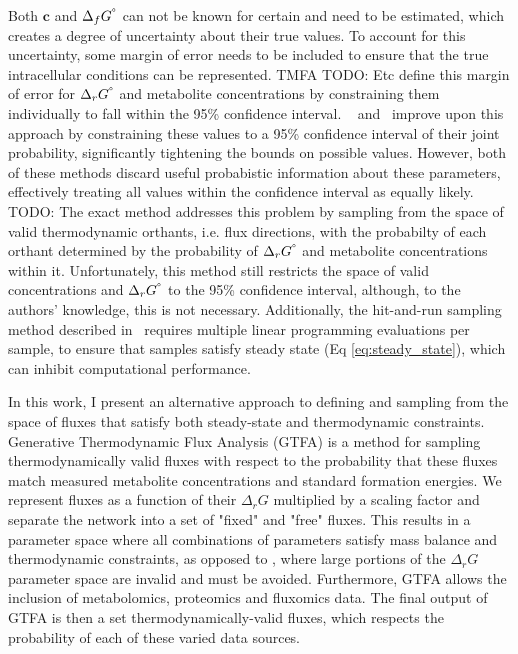 \documentclass[10pt,letterpaper]{article}
\newcommand{\sdgf}{\Delta_fG^{\degree}}
\newcommand{\dgr}{\Delta_rG}
\newcommand{\sdgr}{\Delta_rG^{\degree}}
\begin{document}

Both $\mathbf{c}$ and $\sdgf$ can not be known for certain and need to be estimated, which creates a degree of uncertainty about their true values.
To account for this uncertainty, some margin of error needs to be included to ensure that the true intracellular conditions can be represented.
TMFA {TODO: Etc} define this margin of error for $\sdgr$ and metabolite concentrations by constraining them individually to fall within the 95\% confidence interval.
~\cite{multiTFA} and~\cite{PTA} improve upon this approach by constraining these values to a 95\% confidence interval of their joint probability, significantly tightening the bounds on possible values.
However, both of these methods discard useful probabistic information about these parameters, effectively treating all values within the confidence interval as equally likely.
~\cite{PTA} {TODO: The exact method} addresses this problem by sampling from the space of valid thermodynamic orthants, i.e. flux directions, with the probabilty of each orthant determined by the probability of $\sdgr$ and metabolite concentrations within it.
Unfortunately, this method still restricts the space of valid concentrations and $\sdgr$ to the 95\% confidence interval, although, to the authors' knowledge, this is not necessary.
Additionally, the hit-and-run sampling method described in~\cite{PTA} requires multiple linear programming evaluations per sample, to ensure that samples satisfy steady state (Eq \ref{eq:steady_state}), which can inhibit computational performance.

In this work, I present an alternative approach to defining and sampling from the space of fluxes that satisfy both steady-state and thermodynamic constraints.
Generative Thermodynamic Flux Analysis (GTFA) is a method for sampling thermodynamically valid fluxes with respect to the probability that these fluxes match measured metabolite concentrations and standard formation energies.
We represent fluxes as a function of their $\dgr$ multiplied by a scaling factor and separate the network into a set of "fixed" and "free" fluxes.
This results in a parameter space where all combinations of parameters satisfy mass balance and thermodynamic constraints, as opposed to \cite{PTA}, where large portions of the $\dgr$ parameter space are invalid and must be avoided.
Furthermore, GTFA allows the inclusion of metabolomics, proteomics and fluxomics data.
The final output of GTFA is then a set thermodynamically-valid fluxes, which respects the probability of each of these varied data sources.
\end{document}
